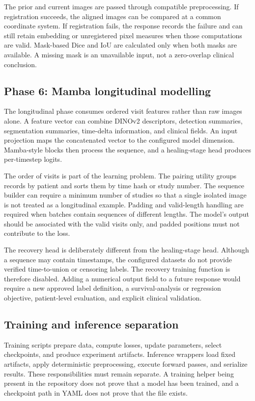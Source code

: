 \documentclass[12pt,a4paper]{article}
\begin{document}
The prior and current images are passed through compatible preprocessing. If registration succeeds, the aligned images can be compared at a common coordinate system. If registration fails, the response records the failure and can still retain embedding or unregistered pixel measures when those computations are valid. Mask-based Dice and IoU are calculated only when both masks are available. A missing mask is an unavailable input, not a zero-overlap clinical conclusion.

\subsection{Phase 6: Mamba longitudinal modelling}
The longitudinal phase consumes ordered visit features rather than raw images alone. A feature vector can combine DINOv2 descriptors, detection summaries, segmentation summaries, time-delta information, and clinical fields. An input projection maps the concatenated vector to the configured model dimension. Mamba-style blocks then process the sequence, and a healing-stage head produces per-timestep logits.

The order of visits is part of the learning problem. The pairing utility groups records by patient and sorts them by time hash or study number. The sequence builder can require a minimum number of studies so that a single isolated image is not treated as a longitudinal example. Padding and valid-length handling are required when batches contain sequences of different lengths. The model's output should be associated with the valid visits only, and padded positions must not contribute to the loss.

The recovery head is deliberately different from the healing-stage head. Although a sequence may contain timestamps, the configured datasets do not provide verified time-to-union or censoring labels. The recovery training function is therefore disabled. Adding a numerical output field to a future response would require a new approved label definition, a survival-analysis or regression objective, patient-level evaluation, and explicit clinical validation.

\subsection{Training and inference separation}
Training scripts prepare data, compute losses, update parameters, select checkpoints, and produce experiment artifacts. Inference wrappers load fixed artifacts, apply deterministic preprocessing, execute forward passes, and serialize results. These responsibilities must remain separate. A training helper being present in the repository does not prove that a model has been trained, and a checkpoint path in YAML does not prove that the file exists.
\end{document}
